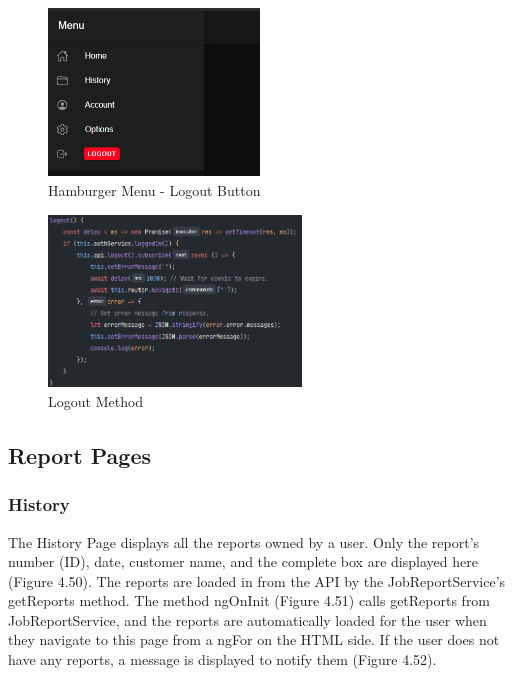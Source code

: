 \begin{figure}[H]
    \caption{Hamburger Menu - Logout Button}
    \label{image:logoutButton}
    \centering
    \includegraphics[width=0.5\textwidth]{images/repota/UI/logout.png}
\end{figure}

\begin{figure}[H]
    \caption{Logout Method}
    \label{image:logoutMethod}
    \centering
    \includegraphics[width=0.6\textwidth]{images/repota/account_pages/logout_method.png}
\end{figure}

\subsection{Report Pages}

\subsubsection{History}
The History Page displays all the reports owned by a user. Only the report's number (ID), date, customer name, and the complete box are displayed here (Figure 4.50). The reports are loaded in from the API by the JobReportService's getReports method. The method ngOnInit (Figure 4.51) calls getReports from JobReportService, and the reports are automatically loaded for the user when they navigate to this page from a ngFor on the HTML side. If the user does not have any reports, a message is displayed to notify them (Figure 4.52). 


